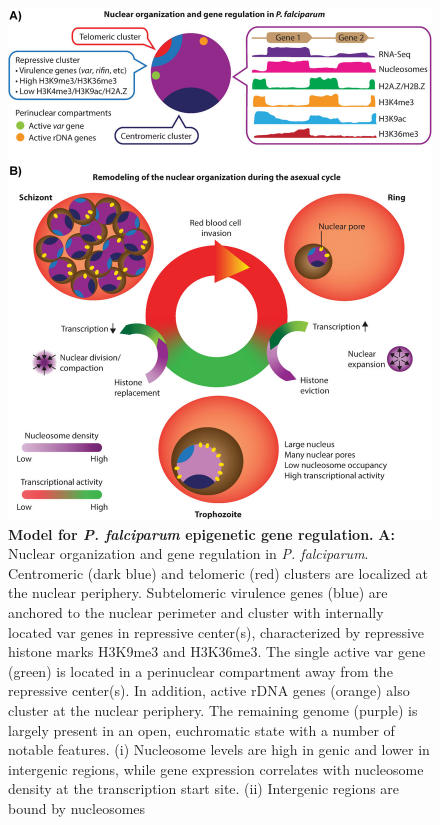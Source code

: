 \begin{figure}
\begin{center}
\includegraphics[width=\linewidth]{figures/fig4.png}
\end{center}
\label{fig:fig4}
\caption{\textbf{Model for \textit{P. falciparum} epigenetic gene regulation.}
 \textbf{A:} Nuclear organization and gene regulation in \textit{P. falciparum}. Centromeric
 (dark blue) and telomeric (red) clusters are localized at the nuclear
 periphery. Subtelomeric virulence genes (blue) are anchored to the nuclear
 perimeter and cluster with internally located var genes in repressive
 center(s), characterized by repressive histone marks H3K9me3 and H3K36me3.
 The single active var gene (green) is located in a perinuclear compartment
 away from the repressive center(s). In addition, active rDNA genes (orange)
 also cluster at the nuclear periphery. The remaining genome (purple) is
 largely present in an open, euchromatic state with a number of notable
 features. (i) Nucleosome levels are high in genic and lower in intergenic
 regions, while gene expression correlates with nucleosome density at the
 transcription start site. (ii) Intergenic regions are bound by nucleosomes
}
\end{figure}
